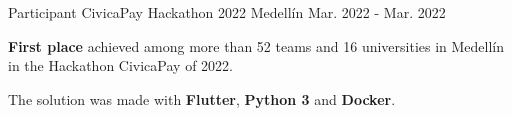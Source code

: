 
\begin{cventries}
  \cventry
  {Participant} %
  {CivicaPay Hackathon 2022} %
  {Medellín} %
  {Mar. 2022 - Mar. 2022} %
  {
    \begin{cvitems} %
      \item {\textbf{First place} achieved among more than 52 teams and 16 universities in
                  Medellín in the Hackathon CivicaPay of 2022.}
      \item {The solution was made with \textbf{Flutter}, \textbf{Python 3} and \textbf{Docker}.}
    \end{cvitems}
  }

\end{cventries}
